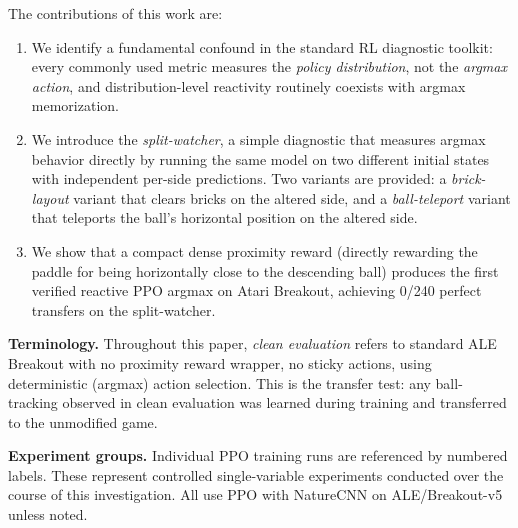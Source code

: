 \documentclass[11pt]{article}
\begin{document}
The contributions of this work are:
\begin{enumerate}
    \item We identify a fundamental confound in the standard RL diagnostic
    toolkit: every commonly used metric measures the \emph{policy distribution},
    not the \emph{argmax action}, and distribution-level reactivity routinely
    coexists with argmax memorization.
    \item We introduce the \emph{split-watcher}, a simple diagnostic that
    measures argmax behavior directly by running the same model on two
    different initial states with independent per-side predictions. Two variants
    are provided: a \emph{brick-layout} variant that clears bricks on the altered
    side, and a \emph{ball-teleport} variant that teleports the ball's horizontal
    position on the altered side.
    \item We show that a compact dense proximity reward (directly rewarding
    the paddle for being horizontally close to the descending ball) produces
    the first verified reactive PPO argmax on Atari Breakout, achieving
    0/240 perfect transfers on the split-watcher.
\end{enumerate}

\noindent \textbf{Terminology.} Throughout this paper, \emph{clean evaluation}
refers to standard ALE Breakout with no proximity reward wrapper, no sticky
actions, using deterministic (argmax) action selection. This is the transfer
test: any ball-tracking observed in clean evaluation was learned during
training and transferred to the unmodified game.

\noindent \textbf{Experiment groups.} Individual PPO training runs are
referenced by numbered labels. These represent controlled single-variable
experiments conducted over the course of this investigation. All use PPO with
NatureCNN on ALE/Breakout-v5 unless noted.
\end{document}
